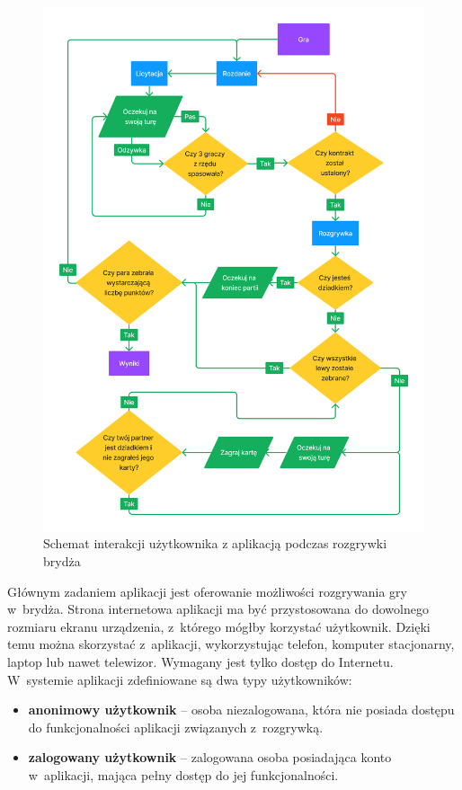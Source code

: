 \begin{figure}[!]
  \centering
  \includegraphics[width=\textwidth]{img/flow-aplikacji/game_flow.png}
  \caption{Schemat interakcji użytkownika z aplikacją podczas rozgrywki brydża}
\end{figure}

Głównym zadaniem aplikacji jest oferowanie możliwości
rozgrywania gry w~brydża. Strona internetowa aplikacji ma być
przystosowana do dowolnego rozmiaru ekranu urządzenia, z~którego mógłby
korzystać użytkownik. Dzięki temu można skorzystać z~aplikacji, wykorzystując
telefon, komputer stacjonarny, laptop lub nawet telewizor. Wymagany
jest tylko dostęp do Internetu. \\

W~systemie aplikacji zdefiniowane są dwa typy użytkowników:
\begin{itemize}
  \item \textbf{anonimowy użytkownik} -- osoba niezalogowana, która nie
        posiada dostępu do funkcjonalności aplikacji związanych
        z~rozgrywką.

  \item \textbf{zalogowany użytkownik} -- zalogowana osoba posiadająca konto
        w~aplikacji, mająca pełny dostęp do jej funkcjonalności.
\end{itemize}


